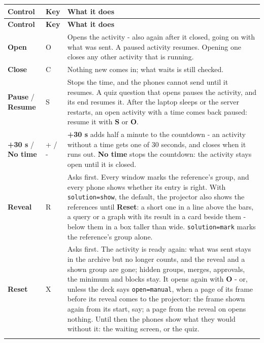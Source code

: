 \documentclass[a4paper,11pt]{article}
\begin{document}
{\small
\begin{longtable}{>{\raggedright\arraybackslash}p{}>{\raggedright\arraybackslash}p{}>{\raggedright\arraybackslash}p{}}
\toprule
\textbf{Control} & \textbf{Key} & \textbf{What it does} \\
\midrule
\endfirsthead
\toprule
\textbf{Control} & \textbf{Key} & \textbf{What it does} \\
\midrule
\endhead
\midrule
\endfoot
\bottomrule
\endlastfoot
\textbf{Open} & O & Opens the activity -\allowbreak{} also again after it closed, going on with what was sent.\allowbreak{} A paused activity resumes.\allowbreak{} Opening one closes any other activity that is running. \\ \addlinespace[3pt]
\textbf{Close} & C & Nothing new comes in; what waits is still checked. \\ \addlinespace[3pt]
\textbf{Pause} /\allowbreak{} \textbf{Resume} & S & Stops the time, and the phones cannot send until it resumes.\allowbreak{} A quiz question that opens pauses the activity, and its end resumes it.\allowbreak{} After the laptop sleeps or the server restarts, an open activity with a time comes back paused: resume it with \textbf{S} or \textbf{O}. \\ \addlinespace[3pt]
\textbf{+30 s} /\allowbreak{} \textbf{No time} & + /\allowbreak{} - & \textbf{+30 s} adds half a minute to the countdown -\allowbreak{} an activity without a time gets one of 30 seconds, and closes when it runs out.\allowbreak{} \textbf{No time} stops the countdown: the activity stays open until it is closed. \\ \addlinespace[3pt]
\textbf{Reveal} & R & Asks first.\allowbreak{} Every window marks the reference's group, and every phone shows whether its entry is right.\allowbreak{} With \texttt{solution=\allowbreak{}show}, the default, the projector also shows the references until \textbf{Reset}: a short one in a line above the bars, a query or a graph with its result in a card beside them -\allowbreak{} below them in a box taller than wide.\allowbreak{} \texttt{solution=\allowbreak{}mark} marks the reference's group alone. \\ \addlinespace[3pt]
\textbf{Reset} & X & Asks first.\allowbreak{} The activity is ready again: what was sent stays in the archive but no longer counts, and the reveal and a shown group are gone; hidden groups, merges, approvals, the minimum and blocks stay.\allowbreak{} It opens again with \textbf{O} -\allowbreak{} or, unless the deck says \texttt{open=\allowbreak{}manual}, when a page of its frame before its reveal comes to the projector: the frame shown again from its start, say; a page from the reveal on opens nothing.\allowbreak{} Until then the phones show what they would without it: the waiting screen, or the quiz. \\ \addlinespace[3pt]
\end{longtable}}
\end{document}
